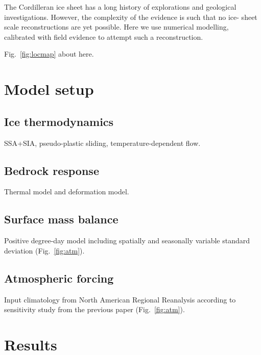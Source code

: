 \documentclass[tc, ms]{copernicus}
\begin{document}
\introduction
\label{sec:intro}

The Cordilleran ice sheet has a long history of explorations and geological
investigations. However, the complexity of the evidence is such that no ice-
sheet scale reconstructions are yet possible. Here we use numerical modelling,
calibrated with field evidence to attempt such a reconstruction.

Fig.~\ref{fig:locmap} about here.

\section{Model setup}
\label{sec:model}

\subsection{Ice thermodynamics}

SSA+SIA, pseudo-plastic sliding, temperature-dependent flow.

\subsection{Bedrock response}

Thermal model and deformation model.

\subsection{Surface mass balance}

Positive degree-day model including spatially and seasonally variable standard
deviation (Fig.~\ref{fig:atm}).

\subsection{Atmospheric forcing}

Input climatology from North American Regional Reanalysis according to
sensitivity study from the previous paper (Fig.~\ref{fig:atm}).

\section{Results}
\label{sec:results}
\end{document}
